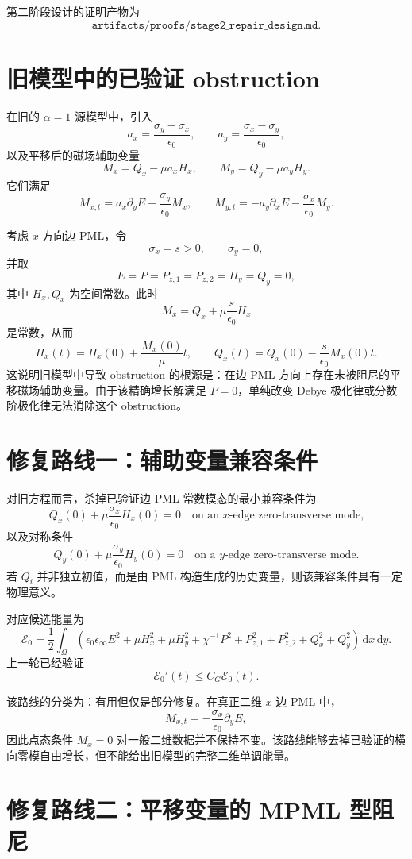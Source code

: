 \documentclass[UTF8,a4paper,12pt]{ctexart}
\newcommand{\dd}{\,\mathrm{d}}
\newcommand{\Om}{\Omega}
\newcommand{\sx}{\sigma_x}
\newcommand{\sy}{\sigma_y}
\newcommand{\Ecal}{\mathcal E}
\begin{document}
第二阶段设计的证明产物为
\[
\texttt{artifacts/proofs/stage2\_repair\_design.md}.
\]

\section{旧模型中的已验证 obstruction}

在旧的 \(\alpha=1\) 源模型中，引入
\[
a_x=\frac{\sy-\sx}{\epsilon_0},\qquad
a_y=\frac{\sx-\sy}{\epsilon_0},
\]
以及平移后的磁场辅助变量
\[
M_x=Q_x-\mu a_xH_x,\qquad M_y=Q_y-\mu a_yH_y.
\]
它们满足
\[
M_{x,t}=a_x\partial_yE-\frac{\sy}{\epsilon_0}M_x,\qquad
M_{y,t}=-a_y\partial_xE-\frac{\sx}{\epsilon_0}M_y .
\]

考虑 \(x\)-方向边 PML，令
\[
\sx=s>0,\qquad \sy=0,
\]
并取
\[
E=P=P_{z,1}=P_{z,2}=H_y=Q_y=0,
\]
其中 \(H_x,Q_x\) 为空间常数。此时
\[
M_x=Q_x+\mu\frac{s}{\epsilon_0}H_x
\]
是常数，从而
\[
H_x(t)=H_x(0)+\frac{M_x(0)}{\mu}t,\qquad
Q_x(t)=Q_x(0)-\frac{s}{\epsilon_0}M_x(0)t .
\]
这说明旧模型中导致 obstruction 的根源是：在边 PML 方向上存在未被阻尼的平移磁场辅助变量。由于该精确增长解满足 \(P=0\)，单纯改变 Debye 极化律或分数阶极化律无法消除这个 obstruction。

\section{修复路线一：辅助变量兼容条件}

对旧方程而言，杀掉已验证边 PML 常数模态的最小兼容条件为
\[
Q_x(0)+\mu\frac{\sx}{\epsilon_0}H_x(0)=0
\quad\text{on an \(x\)-edge zero-transverse mode,}
\]
以及对称条件
\[
Q_y(0)+\mu\frac{\sy}{\epsilon_0}H_y(0)=0
\quad\text{on a \(y\)-edge zero-transverse mode.}
\]
若 \(Q_i\) 并非独立初值，而是由 PML 构造生成的历史变量，则该兼容条件具有一定物理意义。

对应候选能量为
\[
\Ecal_0=\frac12\int_\Om
\left(
\epsilon_0\epsilon_\infty E^2+\mu H_x^2+\mu H_y^2
+\chi^{-1}P^2+P_{z,1}^2+P_{z,2}^2+Q_x^2+Q_y^2
\right)\dd x\dd y .
\]
上一轮已经验证
\[
\Ecal_0'(t)\le C_G\Ecal_0(t).
\]

该路线的分类为：有用但仅是部分修复。在真正二维 \(x\)-边 PML 中，
\[
M_{x,t}=-\frac{\sx}{\epsilon_0}\partial_yE,
\]
因此点态条件 \(M_x=0\) 对一般二维数据并不保持不变。该路线能够去掉已验证的横向零模自由增长，但不能给出旧模型的完整二维单调能量。

\section{修复路线二：平移变量的 MPML 型阻尼}
\end{document}
